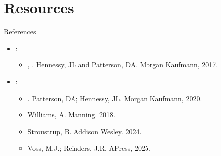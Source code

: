 \section{Resources}

\begin{frame}[t]{References}
\begin{itemize}
  \item {}:
    \begin{itemize}
      \item {}, . 
            Hennessy, JL and Patterson, DA. 
            Morgan Kaufmann, 2017.
    \end{itemize}
  \vspace{1em}
  \pause
  \item {}:
    \begin{itemize}
      \item {}. 
            Patterson, DA; Hennessy, JL. 
            Morgan Kaufmann, 2020.
      \item {} 
            Williams, A.  
            Manning. 2018.
      \item {} 
            Stroustrup, B.
            Addison Wesley. 2024.
      \item {}
            Voss, M.J.; Reinders, J.R.
            APress, 2025.
    \end{itemize}
\end{itemize}
\end{frame}

